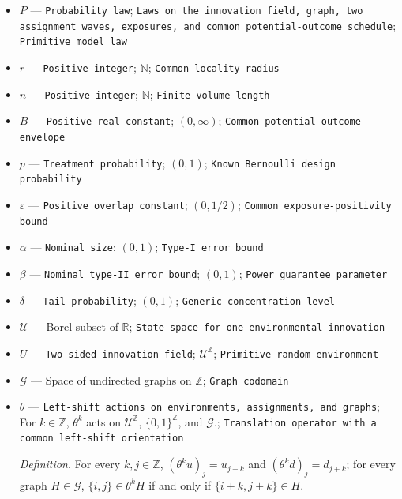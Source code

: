 \documentclass{article}
\begin{document}
\begin{itemize}
  \item \(P\) --- \texttt{Probability law}; \texttt{Laws on the innovation field,\allowbreak{} graph,\allowbreak{} two assignment waves,\allowbreak{} exposures,\allowbreak{} and common potential-\allowbreak{}outcome schedule}; \texttt{Primitive model law}
  \item \(r\) --- \texttt{Positive integer}; \(\mathbb N\); \texttt{Common locality radius}
  \item \(n\) --- \texttt{Positive integer}; \(\mathbb N\); \texttt{Finite-\allowbreak{}volume length}
  \item \(B\) --- \texttt{Positive real constant}; \((0,\infty)\); \texttt{Common potential-\allowbreak{}outcome envelope}
  \item \(p\) --- \texttt{Treatment probability}; \((0,1)\); \texttt{Known Bernoulli design probability}
  \item \(\varepsilon\) --- \texttt{Positive overlap constant}; \((0,1/2)\); \texttt{Common exposure-\allowbreak{}positivity bound}
  \item \(\alpha\) --- \texttt{Nominal size}; \((0,1)\); \texttt{Type-\allowbreak{}I error bound}
  \item \(\beta\) --- \texttt{Nominal type-\allowbreak{}II error bound}; \((0,1)\); \texttt{Power guarantee parameter}
  \item \(\delta\) --- \texttt{Tail probability}; \((0,1)\); \texttt{Generic concentration level}
  \item \(\mathcal U\) --- Borel subset of \(\mathbb R\); \texttt{State space for one environmental innovation}
  \item \(U\) --- \texttt{Two-\allowbreak{}sided innovation field}; \(\mathcal U^{\mathbb Z}\); \texttt{Primitive random environment}
  \item \(\mathcal G\) --- Space of undirected graphs on \(\mathbb Z\); \texttt{Graph codomain}
  \item \(\theta\) --- \texttt{Left-\allowbreak{}shift actions on environments,\allowbreak{} assignments,\allowbreak{} and graphs}; For \(k\in\mathbb Z\), \(\theta^k\) acts on \(\mathcal U^{\mathbb Z}\), \(\{0,1\}^{\mathbb Z}\), and \(\mathcal G\).; \texttt{Translation operator with a common left-\allowbreak{}shift orientation}
  \par\smallskip\noindent\emph{Definition.} For every \(k,j\in\mathbb Z\), \((\theta^ku)_j=u_{j+k}\) and \((\theta^kd)_j=d_{j+k}\); for every graph \(H\in\mathcal G\), \(\{i,j\}\in\theta^kH\) if and only if \(\{i+k,j+k\}\in H\).

\end{itemize}
\end{document}
